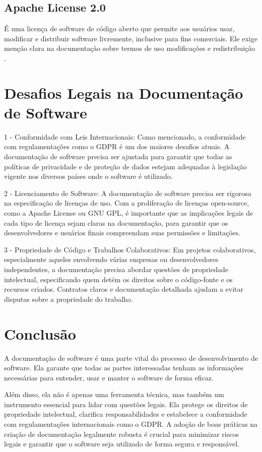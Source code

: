 \documentclass[12pt,oneside,a4paper,article]{abntex2}
\begin{document}
\subsection{Apache License 2.0}
É uma licença de software de código aberto que permite aos usuários usar, modificar e distribuir software livremente, inclusive para fins comerciais. Ele exige menção clara na documentação sobre termos de uso modificações e redistribuição \cite{Apache2}.


\section{Desafios Legais na Documentação de Software}
1 - Conformidade com Leis Internacionais: Como mencionado, a conformidade com regulamentações como o GDPR é um dos maiores desafios atuais. A documentação de software precisa ser ajustada para garantir que todas as políticas de privacidade e de proteção de dados estejam adequadas à legislação vigente nos diversos países onde o software é utilizado.

2 - Licenciamento de Software: A documentação de software precisa ser rigorosa na especificação de licenças de uso. Com a proliferação de licenças open-source, como a Apache License ou GNU GPL, é importante que as implicações legais de cada tipo de licença sejam claras na documentação, para garantir que os desenvolvedores e usuários finais compreendam suas permissões e limitações.

3 - Propriedade de Código e Trabalhos Colaborativos: Em projetos colaborativos, especialmente aqueles envolvendo várias empresas ou desenvolvedores independentes, a documentação precisa abordar questões de propriedade intelectual, especificando quem detém os direitos sobre o código-fonte e os recursos criados. Contratos claros e documentação detalhada ajudam a evitar disputas sobre a propriedade do trabalho.

\section{Conclusão}
A documentação de software é uma parte vital do processo de desenvolvimento de software. Ela garante que todas as partes interessadas tenham as informações necessárias para entender, usar e manter o software de forma eficaz. 

Além disso, ela não é apenas uma ferramenta técnica, mas também
um instrumento essencial para lidar com questões legais. Ela protege os direitos
de propriedade intelectual, clarifica responsabilidades e estabelece a conformidade com regulamentações internacionais como o GDPR. A adoção de boas
práticas na criação de documentação legalmente robusta é crucial para minimizar riscos legais e garantir que o software seja utilizado de forma segura e
responsável.


\newpage

\end{document}
